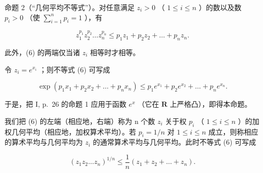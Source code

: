 命题 2（“几何平均不等式”）。对任意满足 \(z_{i} > 0\) （ \(1 \leqslant i \leqslant n\) ）的数以及数 \(p_{i} > 0\) （使 \(\sum_{i=1}^{n} p_{i} = 1\) ），有

\[
z _ {1} ^ {p _ {1}} z _ {2} ^ {p _ {2}} \dots z _ {n} ^ {p _ {n}} \leqslant p _ {1} z _ {1} + p _ {2} z _ {2} + \dots + p _ {n} z _ {n}.\tag{6}
\]

此外，(6) 的两端仅当诸 \(z_{i}\) 相等时才相等。

令 \(z_{i} = e^{x_{i}}\) ；则不等式 (6) 可写成

\[
\exp \left(p _ {1} x _ {1} + p _ {2} x _ {2} + \dots + p _ {n} x _ {n}\right) \leqslant p _ {1} e ^ {x _ {1}} + p _ {2} e ^ {x _ {2}} + \dots + p _ {n} e ^ {x _ {n}}.\tag{7}
\]

于是，把 I, p.~26 的命题 1 应用于函数 \(e^x\) （它在 \(\mathbf{R}\) 上严格凸），即得本命题。

我们把 (6) 的左端（相应地，右端）称为 n 个数 \(z_{i}\) 关于权 \(p_{i}\) （ \(1 \leqslant i \leqslant n\) ）的加权几何平均（相应地，加权算术平均）。若 \(p_{i} = 1/n\) 对 \(1 \leqslant i \leqslant n\) 成立，则称相应的算术平均与几何平均为 \(z_{i}\) 的通常算术平均与几何平均。此时不等式 (6) 可写成

\[
\left(z _ {1} z _ {2} \dots z _ {n}\right) ^ {1 / n} \leqslant \frac {1}{n} \left(z _ {1} + z _ {2} + \dots + z _ {n}\right).\tag{8}
\]

